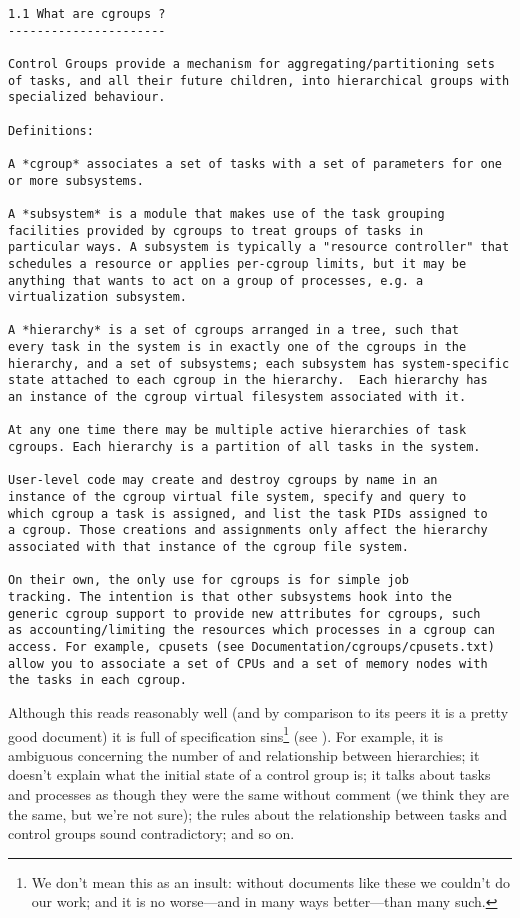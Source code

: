 \documentclass[a4paper,twoside,12pt]{article}
\begin{document}
{\small \begin{verbatim}
1.1 What are cgroups ?
----------------------

Control Groups provide a mechanism for aggregating/partitioning sets
of tasks, and all their future children, into hierarchical groups with
specialized behaviour.

Definitions:

A *cgroup* associates a set of tasks with a set of parameters for one
or more subsystems.

A *subsystem* is a module that makes use of the task grouping
facilities provided by cgroups to treat groups of tasks in
particular ways. A subsystem is typically a "resource controller" that
schedules a resource or applies per-cgroup limits, but it may be
anything that wants to act on a group of processes, e.g. a
virtualization subsystem.

A *hierarchy* is a set of cgroups arranged in a tree, such that
every task in the system is in exactly one of the cgroups in the
hierarchy, and a set of subsystems; each subsystem has system-specific
state attached to each cgroup in the hierarchy.  Each hierarchy has
an instance of the cgroup virtual filesystem associated with it.

At any one time there may be multiple active hierarchies of task
cgroups. Each hierarchy is a partition of all tasks in the system.

User-level code may create and destroy cgroups by name in an
instance of the cgroup virtual file system, specify and query to
which cgroup a task is assigned, and list the task PIDs assigned to
a cgroup. Those creations and assignments only affect the hierarchy
associated with that instance of the cgroup file system.

On their own, the only use for cgroups is for simple job
tracking. The intention is that other subsystems hook into the
generic cgroup support to provide new attributes for cgroups, such
as accounting/limiting the resources which processes in a cgroup can
access. For example, cpusets (see Documentation/cgroups/cpusets.txt)
allow you to associate a set of CPUs and a set of memory nodes with
the tasks in each cgroup.
\end{verbatim}}
Although this reads reasonably well (and by comparison to its peers it is a pretty good document) it is
full of specification sins\footnote{We don't mean this as an insult: without documents like these we couldn't do our work; and it is no worse---and in many ways better---than many such.} (see \cite{7sins}). For example, it is ambiguous concerning the number of and relationship between hierarchies; it
doesn't explain what the initial state of a control group is; it talks about tasks and processes as though they were the same without comment (we think they are the same, but we're not sure); the rules about the relationship between tasks and control groups sound contradictory; and so on.
\end{document}
